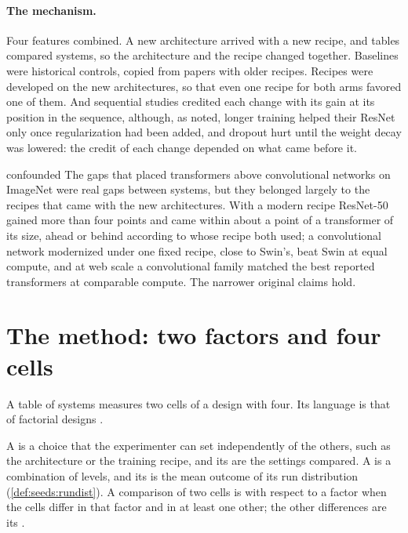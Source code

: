 \begin{refsection}
\paragraph{The mechanism.} Four features combined. A new architecture arrived with a new recipe, and tables compared systems, so the architecture and the recipe changed together. Baselines were historical controls, copied from papers with older recipes. Recipes were developed on the new architectures, so that even one recipe for both arms favored one of them. And sequential studies credited each change with its gain at its position in the sequence, although, as \textcite{BelloEtAl2021} noted, longer training helped their ResNet only once regularization had been added, and dropout hurt until the weight decay was lowered: the credit of each change depended on what came before it.

\begin{verdict}{confounded}
The gaps that placed transformers above convolutional networks on ImageNet were real gaps between systems, but they belonged largely to the recipes that came with the new architectures. With a modern recipe ResNet-50 gained more than four points and came within about a point of a transformer of its size, ahead or behind according to whose recipe both used; a convolutional network modernized under one fixed recipe, close to Swin's, beat Swin at equal compute, and at web scale a convolutional family matched the best reported transformers at comparable compute. The narrower original claims hold.
\end{verdict}

\section{The method: two factors and four cells}\label{sec:confounding:twobytwo}

A table of systems measures two cells of a design with four. Its language is that of factorial designs \parencite{Fisher1935,BoxHunterHunter2005}.

\begin{definition}\label{def:confounding:factors}
A  is a choice that the experimenter can set independently of the others, such as the architecture or the training recipe, and its  are the settings compared. A  is a combination of levels, and its  is the mean outcome of its run distribution (\cref{def:seeds:rundist}). A comparison of two cells is  with respect to a factor when the cells differ in that factor and in at least one other; the other differences are its .
\end{definition}


\end{refsection}
